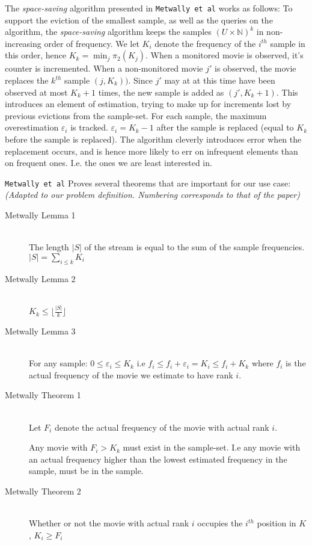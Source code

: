 The \textit{space-saving} algorithm presented in \texttt{Metwally et al} works
as follows:
To support the eviction of the smallest sample, as well as the queries on the
algorithm, the \textit{space-saving} algorithm keeps the samples $(U\times
\mathbb{N})^k$ in non-increasing order of frequency. We let $K_i$ denote the
frequency of the $i^{th}$ sample in this order, hence $K_k = \min_j\pi_2(K_j)$.
When a monitored movie is observed, it's counter is incremented. When a
non-monitored movie $j'$ is observed, the movie replaces the $k^{th}$ sample
$(j,K_k))$. Since $j'$ may at at this time have
been observed at most $K_k+1$ times, the new sample is added as $(j',K_k+1)$. This
introduces an element of estimation, trying to make up for increments lost by
previous evictions from the sample-set. For each sample, the maximum
overestimation $\varepsilon_i$ is tracked. $\varepsilon_i = K_k-1$ after the
sample is replaced (equal to $K_k$ before the sample is replaced). The algorithm
cleverly introduces error when the replacement occurs, and is hence more likely
to err on infrequent elements than on frequent ones. I.e. the ones we are least
interested in.

\texttt{Metwally et al} Proves several theorems that are important for our use
case: \textit{(Adapted to our problem definition. Numbering corresponds to that
of the paper)}
\begin{description}
\item[Metwally Lemma 1] \hfill \\
	The length $|S|$ of the stream is equal to the sum of the sample
	frequencies.
	$|S| = \sum_{i\leq k}K_i$

\item[Metwally Lemma 2] \hfill \\
	$K_k \leq \lfloor \frac{|S|}{k} \rfloor$ 

\item[Metwally Lemma 3] \hfill \\
	For any sample: $0 \leq \varepsilon_i \leq K_k$ i.e $f_i \leq f_i
	+ \varepsilon_i = K_i \leq f_i+K_k$ where $f_i$ is the actual frequency
	of the movie we estimate to have rank $i$.

\item[Metwally Theorem 1] \hfill \\
	Let $F_i$ denote the actual frequency of the movie with actual rank $i$.

	Any movie with $F_i > K_k$ must exist in the sample-set. I.e any movie
	with an actual frequency higher than the lowest estimated frequency in
	the sample, must be in the sample.

\item[Metwally Theorem 2] \hfill \\
	Whether or not the movie with actual rank $i$ occupies the $i^{th}$
	position in $K$, $K_i \geq F_i$

\end{description}

